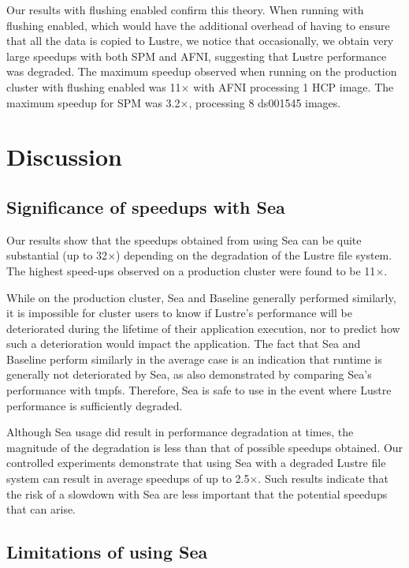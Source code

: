   Our results with flushing enabled confirm this theory. When running with
  flushing enabled, which would have the additional overhead of having to
  ensure that all the data is copied to Lustre, we notice that occasionally, we
  obtain very large speedups with both SPM and AFNI, suggesting that Lustre
  performance was degraded. The
  maximum speedup observed when running on the production cluster with flushing enabled was
  11$\times$ with AFNI processing 1 HCP image. The maximum speedup for SPM was
  3.2$\times$, processing 8 ds001545 images.

    
    \section{Discussion}
    \subsection{Significance of speedups with Sea}

    Our results show that the speedups obtained from using Sea can be quite
    substantial (up to 32$\times$) depending on the degradation of the Lustre
    file system. The highest speed-ups observed on a production cluster were
    found to be 11$\times$.

    While on the production cluster, Sea and Baseline generally performed similarly,
    it is impossible for cluster users to know if Lustre's
    performance will be deteriorated during the lifetime of their application
    execution, nor to predict how such a deterioration would impact the
    application. The fact that Sea and Baseline perform similarly in the average
    case is an indication that runtime is generally not deteriorated by Sea, as
    also demonstrated by comparing Sea's performance with tmpfs. Therefore, Sea
    is safe to use in the event where Lustre performance is sufficiently
    degraded.

    Although Sea usage did result in performance degradation at times, the magnitude
    of the degradation is less than that of possible speedups
    obtained. Our controlled experiments demonstrate that using Sea with a
    degraded Lustre file system can result in average speedups of up to
    2.5$\times$. Such results indicate that the risk of a slowdown with Sea are
    less important that the potential speedups that can arise.

    \subsection{Limitations of using Sea}
    
